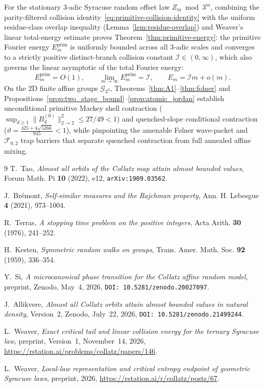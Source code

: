 \documentclass[11pt,a4paper]{article}
\numberwithin{equation}{section}
\theoremstyle{definition}
\theoremstyle{remark}
\newcommand{\cG}{\mathcal{G}}
\newcommand{\cF}{\mathcal{F}}
\newcommand{\cI}{\mathcal{I}}
\newcommand{\prim}{\mathrm{prim}}
\begin{document}
For the stationary $3$-adic Syracuse random offset law $Z_m \bmod 3^m$, combining the parity-filtered collision identity~\eqref{eq:primitive-collision-identity} with the uniform residue-class overlap inequality (Lemma~\ref{lem:residue-overlap}) and Weaver's linear total-energy estimate proves Theorem~\ref{thm:primitive-energy}: the primitive Fourier energy $E_m^{\prim}$ is uniformly bounded across all $3$-adic scales and converges to a strictly positive distinct-branch collision constant $\cI \in (0, \infty)$, which also governs the linear asymptotic of the total Fourier energy:
\[
 \boxed{E_m^{\prim} = O(1), \qquad \lim_{m \to \infty} E_m^{\prim} = \cI, \qquad E_m = \cI m + o(m).}
\]
On the $2$D finite affine groups $\cG_{3^d}$, Theorems~\ref{thm:A1}--\ref{thm:folner} and Propositions~\ref{prop:two_stage_bound}--\ref{prop:atomic_jordan} establish unconditional primitive Mackey shell contraction ($\sup_{d \ge 1}\|B_d^{(0)}\|_{2\to 2}^2 \le 27/49 < 1$) and quenched-slope conditional contraction ($\vartheta = \frac{425 + 4\sqrt{5266}}{945} < 1$), while pinpointing the amenable F{\o}lner wave-packet and $\cF_{0,2}$ trap barriers that separate quenched contraction from full annealed affine mixing.

\begin{thebibliography}{9}
T.~Tao, \textit{Almost all orbits of the Collatz map attain almost bounded values}, Forum Math. Pi \textbf{10} (2022), e12, \texttt{arXiv:1909.03562}.

J.~Br\'emont, \textit{Self-similar measures and the Rajchman property}, Ann. H. Lebesgue \textbf{4} (2021), 973--1004.

R.~Terras, \textit{A stopping time problem on the positive integers}, Acta Arith. \textbf{30} (1976), 241--252.

H.~Kesten, \textit{Symmetric random walks on groups}, Trans. Amer. Math. Soc. \textbf{92} (1959), 336--354.

Y.~Si, \textit{A microcanonical phase transition for the Collatz affine random model}, preprint, Zenodo, May~4, 2026, \texttt{DOI:~10.5281/zenodo.20027097}.

J.~Allikvere, \textit{Almost all Collatz orbits attain almost bounded values in natural density}, Version~2, Zenodo, July~22, 2026, \texttt{DOI:~10.5281/zenodo.21499244}.

L.~Weaver, \textit{Exact critical tail and linear collision energy for the ternary Syracuse law},
preprint, Version~1, November~14, 2026,
\url{https://rstation.ai/problems/collatz/papers/146}.

L.~Weaver, \textit{Local-law representation and critical entropy endpoint of geometric Syracuse laws},
preprint, 2026, \url{https://rstation.ai/r/collatz/posts/67}.
\end{thebibliography}
\end{document}
